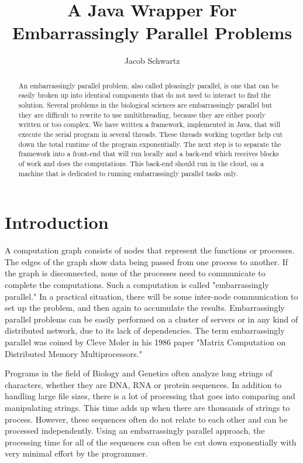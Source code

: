 \documentclass[12pt]{article}
\begin{document}
\title{A Java Wrapper For Embarrassingly Parallel Problems}
\author{Jacob Schwartz}
\maketitle

\begin{abstract}
An embarrassingly parallel problem, also called pleasingly parallel, is one that 
can be easily broken up into identical components that do not need to interact 
to find the solution. Several problems in the biological sciences are 
embarrassingly parallel but they are difficult to rewrite to use multithreading, 
because they are either poorly written or too complex. We have written a 
framework, implemented in Java, that will execute the serial program in several 
threads. These threads working together help cut down the total runtime of the
program exponentially. The next step is to separate the framework into a 
front-end that will run locally and a back-end which receives blocks of work and 
does the computations. This back-end should run in the cloud, on a machine that 
is dedicated to running embarrassingly parallel tasks only.
\end{abstract}

\section{Introduction}

A computation graph consists of nodes that represent the functions or processes. 
The edges of the graph show data being passed from one process to another. If 
the graph is disconnected, none of the processes need to communicate to complete
the computations. Such a computation is called "embarrassingly parallel." In a 
practical situation, there will be some inter-node communication to set up the 
problem, and then again to accumulate the results. Embarrassingly parallel 
problems can be easily performed on a cluster of servers or in any kind of 
distributed network, due to its lack of dependencies. The term embarrassingly 
parallel was coined by Cleve Moler in his 1986 paper "Matrix Computation on 
Distributed Memory Multiprocessors." \cite{history}

Programs in the field of Biology and Genetics often analyze long strings of
characters, whether they are DNA, RNA or protein sequences. In addition to
handling large file sizes, there is a lot of processing that goes into comparing
and manipulating strings. This time adds up when there are thousands of strings 
to process. However, these sequences often do not relate to each other and can 
be processed independently. Using an embarrassingly parallel approach, the 
processing time for all of the sequences can often be cut down exponentially 
with very minimal effort by the programmer.
\end{document}
